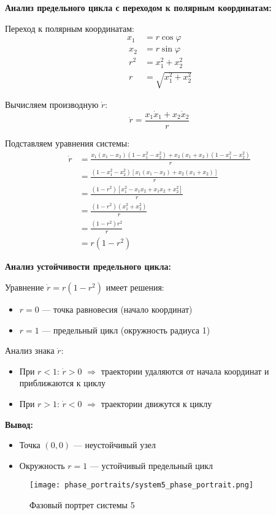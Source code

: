 \textbf{Анализ предельного цикла с переходом к полярным координатам:}

Переход к полярным координатам:
\begin{align}
x_1 &= r\cos\varphi \\\
x_2 &= r\sin\varphi \\\
r^2 &= x_1^2 + x_2^2 \\\
r &= \sqrt{x_1^2 + x_2^2}
\end{align}

Вычисляем производную $\dot{r}$:
$$\dot{r} = \frac{x_1\dot{x}_1 + x_2\dot{x}_2}{r}$$

Подставляем уравнения системы:
\begin{align}
\dot{r} &= \frac{x_1(x_1 - x_2)(1 - x_1^2 - x_2^2) + x_2(x_1 + x_2)(1 - x_1^2 - x_2^2)}{r} \\\
&= \frac{(1 - x_1^2 - x_2^2)[x_1(x_1 - x_2) + x_2(x_1 + x_2)]}{r} \\\
&= \frac{(1 - r^2)[x_1^2 - x_1x_2 + x_1x_2 + x_2^2]}{r} \\\
&= \frac{(1 - r^2)(x_1^2 + x_2^2)}{r} \\\
&= \frac{(1 - r^2)r^2}{r} \\\
&= r(1 - r^2)
\end{align}

\textbf{Анализ устойчивости предельного цикла:}

Уравнение $\dot{r} = r(1 - r^2)$ имеет решения:
\begin{itemize}
\item $r = 0$ --- точка равновесия (начало координат)
\item $r = 1$ --- предельный цикл (окружность радиуса 1)
\end{itemize}

Анализ знака $\dot{r}$:
\begin{itemize}
\item При $r < 1$: $\dot{r} > 0$ $\Rightarrow$ траектории удаляются от начала координат и приближаются к циклу
\item При $r > 1$: $\dot{r} < 0$ $\Rightarrow$ траектории движутся к циклу
\end{itemize}

\textbf{Вывод:}
\begin{itemize}
\item Точка $(0,0)$ --- неустойчивый узел
\item Окружность $r = 1$ --- устойчивый предельный цикл
\end{itemize}

\begin{figure}[H]
\centering
\texttt{[image: phase\_portraits/system5\_phase\_portrait.png]}
\caption{Фазовый портрет системы 5}
\label{fig:system5_phase_portrait}
\end{figure}

